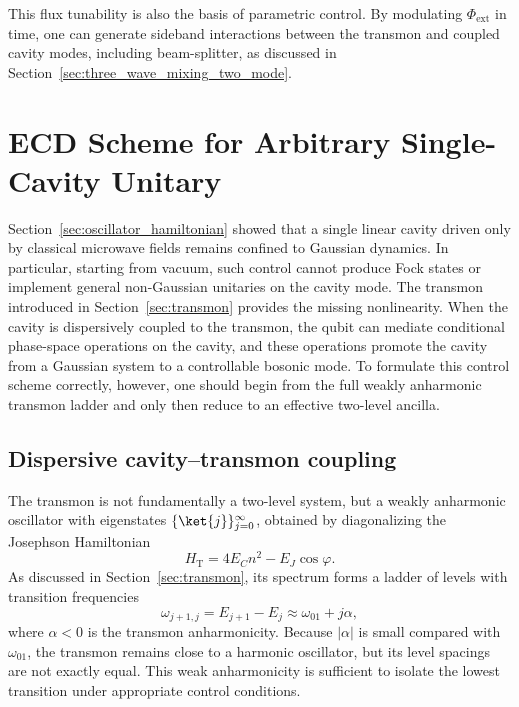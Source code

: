 This flux tunability is also the basis of parametric control. By modulating $\Phi_{\mathrm{ext}}$ in time, one can generate sideband interactions between the transmon and coupled cavity modes, including beam-splitter, as discussed in Section~\ref{sec:three_wave_mixing_two_mode}.


\section{ECD Scheme for Arbitrary Single-Cavity Unitary}
\label{sec:ecd_single_cavity}

Section~\ref{sec:oscillator_hamiltonian} showed that a single linear cavity driven only by classical microwave fields remains confined to Gaussian dynamics. In particular, starting from vacuum, such control cannot produce Fock states or implement general non-Gaussian unitaries on the cavity mode. The transmon introduced in Section~\ref{sec:transmon} provides the missing nonlinearity. When the cavity is dispersively coupled to the transmon, the qubit can mediate conditional phase-space operations on the cavity, and these operations promote the cavity from a Gaussian system to a controllable bosonic mode. To formulate this control scheme correctly, however, one should begin from the full weakly anharmonic transmon ladder and only then reduce to an effective two-level ancilla.

\subsection{Dispersive cavity--transmon coupling}
\label{sec:ecd_dispersive_coupling}

The transmon is not fundamentally a two-level system, but a weakly anharmonic oscillator with eigenstates
\(\{\ket{j}\}_{j=0}^\infty\), obtained by diagonalizing the Josephson Hamiltonian
\begin{equation}
    H_{\mathrm{T}}
    =
    4E_C n^2
    -
    E_J \cos \varphi.
\end{equation}
As discussed in Section~\ref{sec:transmon}, its spectrum forms a ladder of levels with transition frequencies
\begin{equation}
    \omega_{j+1,j}
    =
    E_{j+1}-E_j
    \approx
    \omega_{01} + j\alpha,
\end{equation}
where \(\alpha<0\) is the transmon anharmonicity. Because \(|\alpha|\) is small compared with \(\omega_{01}\), the transmon remains close to a harmonic oscillator, but its level spacings are not exactly equal. This weak anharmonicity is sufficient to isolate the lowest transition under appropriate control conditions.

